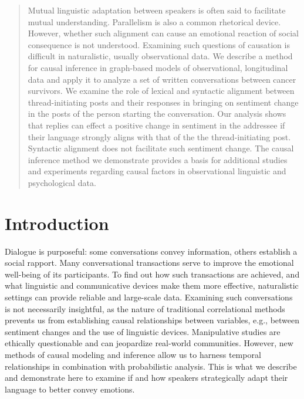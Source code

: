\begin{abstract}
Mutual linguistic adaptation between speakers is often said to facilitate mutual understanding. Parallelism is also a common rhetorical device.  However, whether such alignment can cause an emotional reaction of social consequence is not understood. Examining such questions of causation is difficult in naturalistic, usually observational data.  
We describe a method for causal inference in graph-based models of observational, longitudinal data and apply it to analyze a set of written conversations between cancer survivors. We examine the role of lexical and syntactic alignment between thread-initiating posts and their responses in bringing on sentiment change in the posts of the person starting the conversation. Our analysis shows that replies can effect a positive change in sentiment in the addressee if their language strongly aligns with that of the the thread-initiating post. Syntactic alignment does not facilitate such sentiment change. The causal inference method we demonstrate provides a basis for additional studies and experiments regarding causal factors in observational linguistic and psychological data.
\end{abstract}

\section{Introduction}

Dialogue is purposeful: some conversations convey information, others establish a social rapport.  Many conversational transactions serve to improve the emotional well-being of its participants.  To find out how such transactions are achieved, and what linguistic and communicative devices make them more effective, naturalistic settings can provide reliable and large-scale data.  Examining such conversations is not necessarily insightful, as the nature of traditional correlational methods prevents us from establishing causal relationships between variables, e.g., between sentiment changes and the use of linguistic devices.  Manipulative studies \parencite{kramer2014facebookContagion} are ethically questionable and can jeopardize real-world communities.  However, new methods of causal modeling and inference allow us to harness temporal relationships in combination with probabilistic analysis.  This is what we describe and demonstrate here to examine if and how speakers strategically adapt their language to better convey emotions. 

